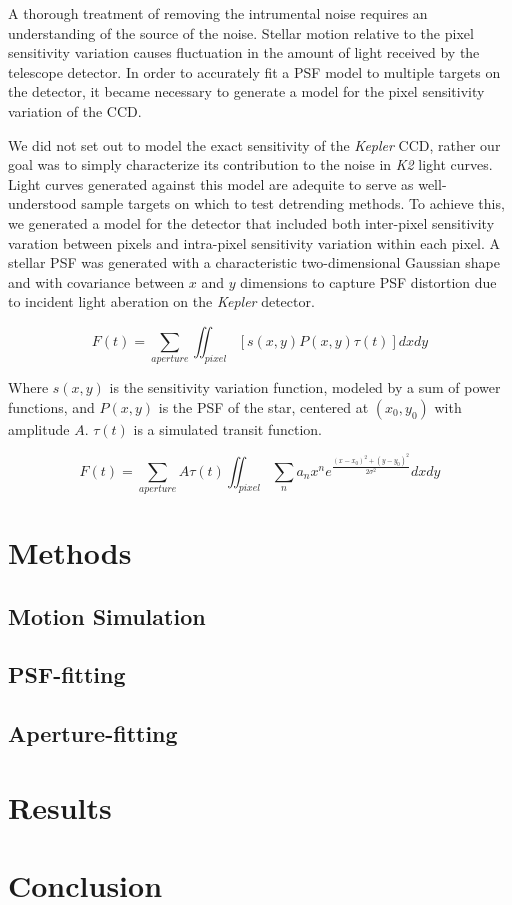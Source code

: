 \documentclass[]{article}
\begin{document}
A thorough treatment of removing the intrumental noise requires an understanding of the source of the noise. Stellar motion relative to the pixel sensitivity variation causes fluctuation in the amount of light received by the telescope detector. In order to accurately fit a PSF model to multiple targets on the detector, it became necessary to generate a model for the pixel sensitivity variation of the CCD. 

We did not set out to model the exact sensitivity of the \textit{Kepler} CCD, rather our goal was to simply characterize its contribution to the noise in \textit{K2} light curves. Light curves generated against this model are adequite to serve as well-understood sample targets on which to test detrending methods. To achieve this, we generated a model for the detector that included both inter-pixel sensitivity varation between pixels and intra-pixel sensitivity variation within each pixel. A stellar PSF was generated with a characteristic two-dimensional Gaussian shape and with covariance between $x$ and $y$ dimensions to capture PSF distortion due to incident light aberation on the \textit{Kepler} detector.

\[
F(t) = \sum_{aperture} \iint_{pixel} [s(x,y)P(x,y)\tau(t)] dxdy 
\]

Where $s(x,y)$ is the sensitivity variation function, modeled by a sum of power functions, and $P(x,y)$ is the PSF of the star, centered at $(x_0,y_0)$ with amplitude $A$. $\tau (t)$ is a simulated transit function.

\[
F(t) = \sum_{aperture} A\tau(t) \iint_{pixel} \sum_n a_n x^n e^{\frac{\left(x-x_0 \right)^2+\left( y-y_0 \right)^2}{2\sigma^2}} dxdy
\]

\section{Methods}

\subsection{Motion Simulation}

\subsection{PSF-fitting}

\subsection{Aperture-fitting}

\section{Results}

\section{Conclusion}
\end{document}
